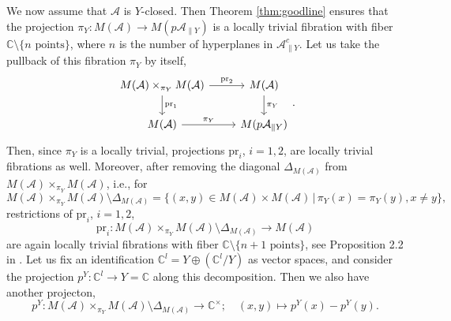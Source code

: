 \documentclass[a4paper,12pt]{article}
\theoremstyle{definition}
\theoremstyle{remark}
\begin{document}
We now assume that $\mathcal{A}$ is $Y$-closed. Then Theorem \ref{thm:goodline} ensures that the projection 
$\pi_{Y}\colon M(\mathcal{A})\rightarrow M(p\mathcal{A}_{\parallel Y})$
is a locally trivial fibration with fiber $\mathbb{C}\setminus \{n\text{ points}\}$, where $n$ is the number of hyperplanes in $\mathcal{A}_{\parallel Y}^{c}$.
Let us take the pullback of this fibration $\pi_{Y}$ by itself,
\[
	\begin{tikzcd}
		M(\mathcal{A})\times_{\pi_{Y}}M(\mathcal{A})\arrow[r,"\mathrm{pr}_{2}"]\arrow[d,"\mathrm{pr}_{1}"]&
		M(\mathcal{A})\arrow[d,"\pi_{Y}"]\\
		M(\mathcal{A})\arrow[r,"\pi_{Y}"]&M(p\mathcal{A}_{\parallel Y})
	\end{tikzcd}.
\]
Then, since $\pi_{Y}$ is a locally trivial, 
projections $\mathrm{pr}_{i}$, $i=1,2$, are locally trivial fibrations as well.
Moreover, 
after removing the diagonal $\Delta_{M(\mathcal{A})}$ from $M(\mathcal{A})\times_{\pi_{Y}}M(\mathcal{A})$, i.e., 
for 
\[
	M(\mathcal{A})\times_{\pi_{Y}}M(\mathcal{A})\setminus \Delta_{M(\mathcal{A})}=\{(x,y)\in M(\mathcal{A})\times M(\mathcal{A})\,|\,\pi_{Y}(x)=\pi_{Y}(y), x\neq y\},
\]
restrictions of $\mathrm{pr}_{i}$, $i=1,2$, 
\[
	\mathrm{pr}_{i}\colon M(\mathcal{A})\times_{\pi_{Y}}M(\mathcal{A})\setminus \Delta_{M(\mathcal{A})}\longrightarrow M(\mathcal{A})
\]
are again locally trivial fibrations with fiber $\mathbb{C}\setminus \{n+1\text{ points}\}$,
see Proposition 2.2 in \cite{AdaHir}.
Let us fix an identification $\mathbb{C}^{l}=Y\oplus (\mathbb{C}^{l}/Y)$
as vector spaces,
and 
consider the projection $p^{Y}\colon \mathbb{C}^{l}\rightarrow Y=\mathbb{C}$
along this decomposition.
Then we also have another projecton,
\[
	p^{Y}\colon M(\mathcal{A})\times_{\pi_{Y}}M(\mathcal{A})\setminus \Delta_{M(\mathcal{A})}\longrightarrow \mathbb{C}^{\times};\quad
	(x,y)\mapsto p^{Y}(x)-p^{Y}(y).
\]
\end{document}
